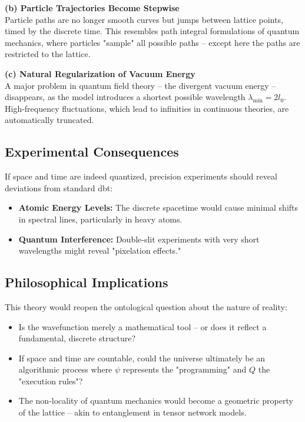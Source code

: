 \textbf{(b) Particle Trajectories Become Stepwise}\\  
Particle paths are no longer smooth curves but jumps between lattice points, timed by the discrete time. This resembles path integral formulations of  
quantum mechanics, where particles "sample" all possible paths – except here the paths are restricted to the lattice.  

\textbf{(c) Natural Regularization of Vacuum Energy}\\  
A major problem in quantum field theory – the divergent vacuum energy – disappears, as the model introduces a shortest possible wavelength $\lambda_\text{min} = 2l_0$. High-frequency fluctuations,  
which lead to infinities in continuous theories, are automatically truncated.  

\subsection{Experimental Consequences}  
If space and time are indeed quantized, precision experiments should reveal deviations from standard \gls{dbt}:  

\begin{itemize}  
    \item \textbf{Atomic Energy Levels:} The discrete spacetime would cause minimal shifts in spectral lines, particularly in heavy atoms.  
    \item \textbf{Quantum Interference:} Double-slit experiments with very short wavelengths might reveal "pixelation effects."  
\end{itemize}  

\subsection{Philosophical Implications}  
This theory would reopen the ontological question about the nature of reality:  
\begin{itemize}  
    \item Is the wavefunction merely a mathematical tool – or does it reflect a fundamental, discrete structure?  
    \item If space and time are countable, could the universe ultimately be an algorithmic process where $\psi$ represents the "programming" and $Q$ the "execution rules"?  
    \item The non-locality of quantum mechanics would become a geometric property of the lattice – akin to entanglement in tensor network models.  
\end{itemize}  

